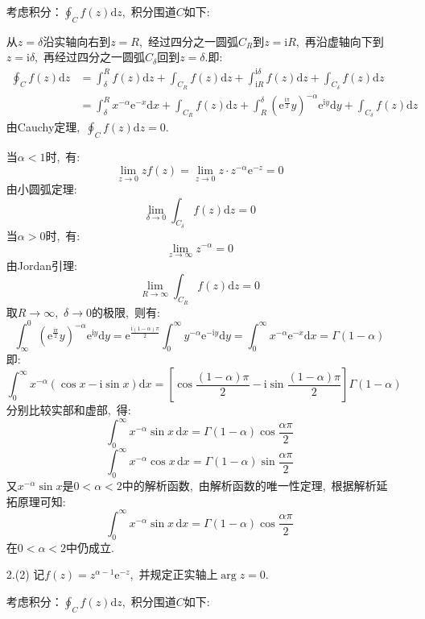 \documentclass[a4paper,fontset=windows]{ctexart}
\begin{document}
\begin{itemize}
考虑积分：$\oint_{C}f(z)\mathrm{d}z$,\ 积分围道$C$如下:

从$z=\delta$沿实轴向右到$z=R$,\ 经过四分之一圆弧$C_{R}$到$z=\mathrm{i}R$,\ 再沿虚轴向下到$z=\mathrm{i}\delta$,\ 再经过四分之一圆弧$C_{\delta}$回到$z=\delta$.即:
\begin{align*}
\oint_{C}f(z)\mathrm{d}z
&=\int_{\delta}^{R}f(z)\mathrm{d}z+
\int_{C_R}f(z)\mathrm{d}z+
\int_{\mathrm{i}R}^{\mathrm{i}\delta}f(z)\mathrm{d}z+
\int_{C_\delta}f(z)\mathrm{d}z \\
&=\int_{\delta}^{R}x^{-\alpha}\mathrm{e}^{-x}\mathrm{d}x+
\int_{C_R}f(z)\mathrm{d}z+
\int_{R}^{\delta}\left(\mathrm{e}^{\frac{\mathrm{i}\pi}{2}}y\right)^{-\alpha}\mathrm{e}^{\mathrm{i}y}\mathrm{d}y+
\int_{C_\delta}f(z)\mathrm{d}z
\end{align*}
由Cauchy定理,\ $\oint_{C}f(z)\mathrm{d}z=0$.

当$\alpha<1$时,\ 有:
\[
\lim_{z\to 0}zf(z)
=\lim_{z\to 0}z\cdot z^{-\alpha}\mathrm{e}^{-z}
=0
\]
由小圆弧定理:
\[
\lim_{\delta\to 0}\int_{C_\delta}f(z)\mathrm{d}z
=0
\]
当$\alpha>0$时,\ 有:
\[
\lim_{z\to\infty}z^{-\alpha}
=0
\]
由Jordan引理:
\[
\lim_{R\to\infty}\int_{C_R}f(z)\mathrm{d}z
=0
\]
取$R\rightarrow\infty$,\ $\delta\rightarrow0$的极限,\ 则有:
\[
\int_{\infty}^{0}\left(\mathrm{e}^{\frac{\mathrm{i}\pi}{2}}y\right)^{-\alpha}\mathrm{e}^{\mathrm{i}y}\mathrm{d}y
=\mathrm{e}^{\frac{\mathrm{i}(1-\alpha)\pi}{2}}\int_{0}^{\infty}y^{-\alpha}\mathrm{e}^{-\mathrm{i}y}\mathrm{d}y
=\int_{0}^{\infty}x^{-\alpha}\mathrm{e}^{-x}\mathrm{d}x
=\Gamma(1-\alpha)
\]
即:
\[
\int_{0}^{\infty}x^{-\alpha}(\cos x-\mathrm{i}\sin x)\mathrm{d}x
=\left[\cos\frac{(1-\alpha)\pi}{2}-\mathrm{i}\sin\frac{(1-\alpha)\pi}{2}\right]\Gamma(1-\alpha)
\]
分别比较实部和虚部,\ 得:
\[
\int_{0}^{\infty}x^{-\alpha}\sin x\,\mathrm{d}x
=\Gamma(1-\alpha)\cos\frac{\alpha\pi}{2}
\]
\[
\int_{0}^{\infty}x^{-\alpha}\cos x\,\mathrm{d}x
=\Gamma(1-\alpha)\sin\frac{\alpha\pi}{2}
\]
又$x^{-\alpha}\sin x$是$0<\alpha<2$中的解析函数,\ 由解析函数的唯一性定理,\ 根据解析延拓原理可知:
\[
\int_{0}^{\infty}x^{-\alpha}\sin x\,\mathrm{d}x
=\Gamma(1-\alpha)\cos\frac{\alpha\pi}{2}
\]
在$0<\alpha<2$中仍成立.

\smallskip
\item[2.(2)]
记$f(z)=z^{\alpha-1}\mathrm{e}^{-z}$,\ 并规定正实轴上$\arg z=0$.

考虑积分：$\oint_{C}f(z)\mathrm{d}z$,\ 积分围道$C$如下:


\end{itemize}
\end{document}
